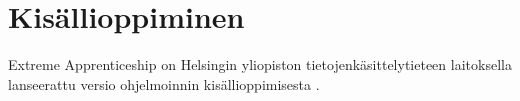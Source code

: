 \section{Kisällioppiminen}


Extreme Apprenticeship on Helsingin yliopiston tietojenkäsittelytieteen
laitoksella lanseerattu versio ohjelmoinnin kisällioppimisesta
\cite{Vihavainen:2011:EAM:1953163.1953196}.


